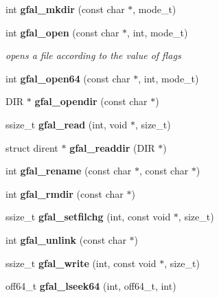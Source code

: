 \begin{DoxyCompactItemize}
\item 
int {\bfseries gfal\_\-mkdir} (const char $\ast$, mode\_\-t)\label{group__posix__group_gab7962e607012a4a82ee9c900aa5a693c}

\item 
int {\bf gfal\_\-open} (const char $\ast$, int, mode\_\-t)
\begin{DoxyCompactList}\small\item\em opens a file according to the value of flags \item\end{DoxyCompactList}\item 
int {\bfseries gfal\_\-open64} (const char $\ast$, int, mode\_\-t)\label{group__posix__group_gab5434b80faefcb20338ecee231185171}

\item 
DIR $\ast$ {\bfseries gfal\_\-opendir} (const char $\ast$)\label{group__posix__group_gacaab04d65b5c41946bbd7ff7ab877b85}

\item 
ssize\_\-t {\bfseries gfal\_\-read} (int, void $\ast$, size\_\-t)\label{group__posix__group_ga2118fa5baa3533bfecd2b3888f401673}

\item 
struct dirent $\ast$ {\bfseries gfal\_\-readdir} (DIR $\ast$)\label{group__posix__group_ga85eff3900519533325f1eef7f44c8a1d}

\item 
int {\bfseries gfal\_\-rename} (const char $\ast$, const char $\ast$)\label{group__posix__group_ga8ec13efefcfffe4368d1716b8b408f76}

\item 
int {\bfseries gfal\_\-rmdir} (const char $\ast$)\label{group__posix__group_ga6ec14778da216b02a3135f0c1181ae0d}

\item 
ssize\_\-t {\bfseries gfal\_\-setfilchg} (int, const void $\ast$, size\_\-t)\label{group__posix__group_gabd9f4f97140c8450eaddf8de7991676c}

\item 
int {\bfseries gfal\_\-unlink} (const char $\ast$)\label{group__posix__group_gabf49493f3ecf135a38c02d72837d6483}

\item 
ssize\_\-t {\bfseries gfal\_\-write} (int, const void $\ast$, size\_\-t)\label{group__posix__group_ga47b0e382f9ed3018f280041f2c4abc04}

\item 
off64\_\-t {\bfseries gfal\_\-lseek64} (int, off64\_\-t, int)\label{group__posix__group_ga16c6d9631685bf2029a5425e52437c52}


\end{DoxyCompactItemize}
